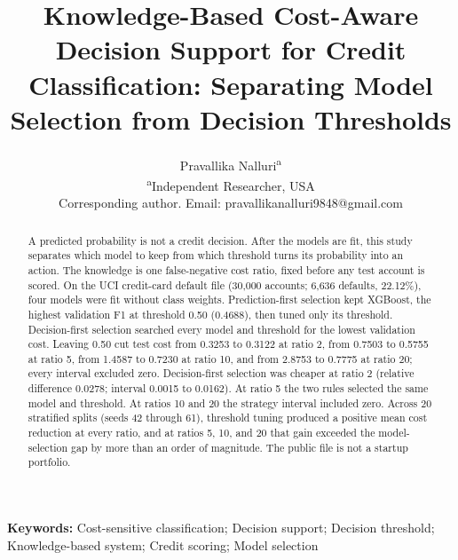 \documentclass[12pt]{article}
\begin{document}
\title{Knowledge-Based Cost-Aware Decision Support for Credit Classification: Separating Model Selection from Decision Thresholds}
\author{%
Pravallika Nalluri\textsuperscript{a}\\[0.4em]
\normalsize \textsuperscript{a}Independent Researcher, USA\\[0.25em]
\normalsize Corresponding author. Email: pravallikanalluri9848@gmail.com%
}
\date{}
\maketitle

\begin{abstract}
\noindent
A predicted probability is not a credit decision. After the models are fit, this study separates which model to keep from which threshold turns its probability into an action. The knowledge is one false-negative cost ratio, fixed before any test account is scored. On the UCI credit-card default file (30,000 accounts; 6,636 defaults, 22.12\%), four models were fit without class weights. Prediction-first selection kept XGBoost, the highest validation F1 at threshold 0.50 (0.4688), then tuned only its threshold. Decision-first selection searched every model and threshold for the lowest validation cost. Leaving 0.50 cut test cost from 0.3253 to 0.3122 at ratio 2, from 0.7503 to 0.5755 at ratio 5, from 1.4587 to 0.7230 at ratio 10, and from 2.8753 to 0.7775 at ratio 20; every interval excluded zero. Decision-first selection was cheaper at ratio 2 (relative difference 0.0278; interval 0.0015 to 0.0162). At ratio 5 the two rules selected the same model and threshold. At ratios 10 and 20 the strategy interval included zero. Across 20 stratified splits (seeds 42 through 61), threshold tuning produced a positive mean cost reduction at every ratio, and at ratios 5, 10, and 20 that gain exceeded the model-selection gap by more than an order of magnitude. The public file is not a startup portfolio.
\end{abstract}

{\sloppy\noindent\textbf{Keywords:} Cost-sensitive classification; Decision support; Decision threshold; Knowledge-based system; Credit scoring; Model selection\par}
\end{document}

